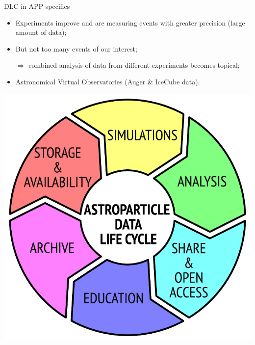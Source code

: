 \begin{frame}{DLC in APP specifics}
\begin{minipage}[c]{0.64\textwidth}
  \begin{itemize}
    \item Experiments improve and are measuring events with greater precision (large amount of data);
    \item But not too many events of our interest;
    \item[$\Rightarrow$] combined analysis of data from different experiments becomes topical;
    \item Astronomical Virtual Observatories (Auger \& IceCube data).
  \end{itemize}
\end{minipage}
\hfill
\begin{minipage}[c]{0.35\textwidth}
  \includegraphics[width=1\textwidth]{pics/ADLC.pdf}
\end{minipage}
\end{frame}

